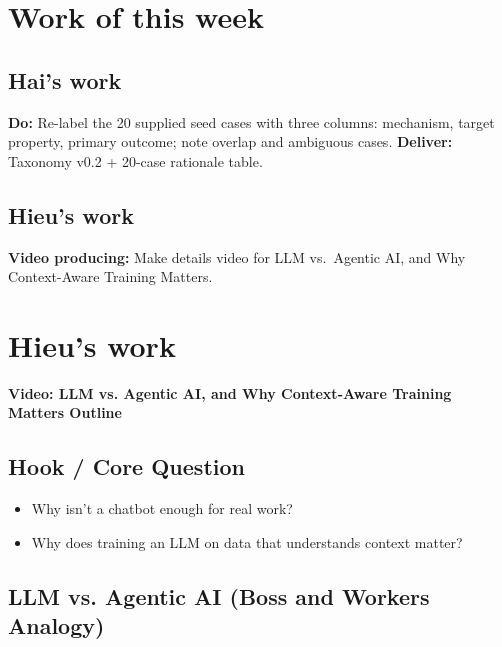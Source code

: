 \documentclass[a4paper,12pt]{report}
\begin{document}
\newpage
\chapter{Work of this week}
\section{Hai's work}
\textbf{Do:} Re-label the 20 supplied seed cases with three columns: mechanism, target property, primary outcome; note overlap and ambiguous cases.
\textbf{Deliver:} Taxonomy v0.2 + 20-case rationale table.
\section{Hieu's work}
\textbf{Video producing:} Make details video for LLM vs.\ Agentic AI, and Why Context-Aware Training Matters.

\chapter{Hieu's work}

\textbf{Video: LLM vs. Agentic AI, and Why Context-Aware Training Matters Outline}

\section{Hook / Core Question}

\begin{itemize}
    \item Why isn't a chatbot enough for real work?
    \item Why does training an LLM on data that understands context matter?
\end{itemize}

\section{LLM vs. Agentic AI (Boss and Workers Analogy)}
\end{document}
